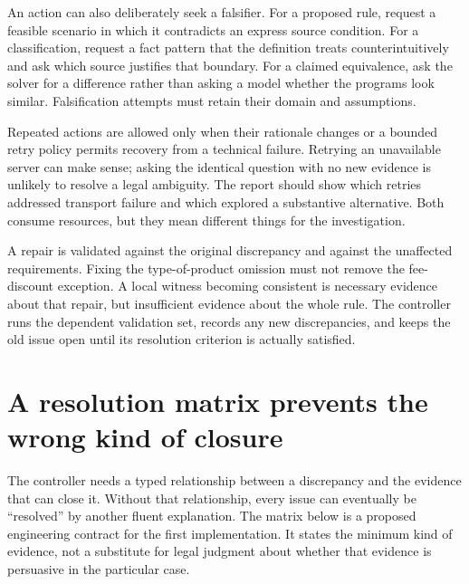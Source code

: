 An action can also deliberately seek a falsifier. For a proposed rule, request a
feasible scenario in which it contradicts an express source condition. For a
classification, request a fact pattern that the definition treats counterintuitively
and ask which source justifies that boundary. For a claimed equivalence, ask the
solver for a difference rather than asking a model whether the programs look
similar. Falsification attempts must retain their domain and assumptions.

Repeated actions are allowed only when their rationale changes or a bounded retry
policy permits recovery from a technical failure. Retrying an unavailable server
can make sense; asking the identical question with no new evidence is unlikely
to resolve a legal ambiguity. The report should show which retries addressed
transport failure and which explored a substantive alternative. Both consume
resources, but they mean different things for the investigation.

A repair is validated against the original discrepancy and against the unaffected
requirements. Fixing the type-of-product omission must not remove the fee-discount
exception. A local witness becoming consistent is necessary evidence about that
repair, but insufficient evidence about the whole rule. The controller runs the
dependent validation set, records any new discrepancies, and keeps the old issue
open until its resolution criterion is actually satisfied.

\section{A resolution matrix prevents the wrong kind of closure}

The controller needs a typed relationship between a discrepancy and the evidence
that can close it. Without that relationship, every issue can eventually be
``resolved'' by another fluent explanation. The matrix below is a proposed
engineering contract for the first implementation. It states the minimum kind of
evidence, not a substitute for legal judgment about whether that evidence is
persuasive in the particular case.

